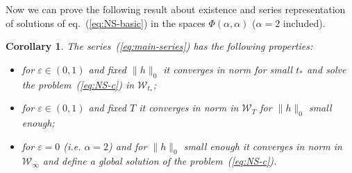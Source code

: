 \documentclass[a4paper,12pt,reqno]{amsart}
\newcommand{\1}{{\bf 1}}
\newcommand{\eps}{\varepsilon}
\newtheorem{corollary}[theorem]{Corollary}
\newcommand{\WW}{\mathcal{W}}
\begin{document}
Now we can prove the following result about existence and
series representation of solutions of eq.~(\ref{eq:NS-basic}) in the
spaces $\Phi(\alpha,\alpha)$ ($\alpha=2$ included).
\begin{corollary}
\label{cor:1}
The series~(\ref{eq:main-series}) has the following properties:
\begin{itemize}
\item[a)] for $\eps \in(0,1)$ and fixed $\|h\|_0$ it converges in norm for small
$t_*$ and solve the problem~(\ref{eq:NS-c}) in $\WW_{t_*}$;
\item[b)] for $\eps \in(0,1)$  and fixed $T$ it converges in norm in $\WW_{T}$ for $\|h\|_0$ small
enough;
\item[c)] for $\eps = 0$ (i.e. $\alpha =2$) and for $\|h\|_0$ small enough it converges in norm in $\WW_\infty$ and define a global solution of the
problem~(\ref{eq:NS-c}).
\end{itemize}
\end{corollary}
\end{document}
